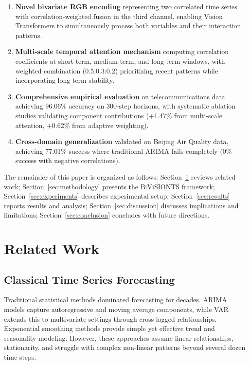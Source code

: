\documentclass[preprint,12pt,authoryear]{elsarticle}
\begin{document}
\begin{enumerate}
    \item \textbf{Novel bivariate RGB encoding} representing two correlated time series with correlation-weighted fusion in the third channel, enabling Vision Transformers to simultaneously process both variables and their interaction patterns.
    
    \item \textbf{Multi-scale temporal attention mechanism} computing correlation coefficients at short-term, medium-term, and long-term windows, with weighted combination (0.5:0.3:0.2) prioritizing recent patterns while incorporating long-term stability.
    
    \item \textbf{Comprehensive empirical evaluation} on telecommunications data achieving 96.06\% accuracy on 300-step horizons, with systematic ablation studies validating component contributions (+1.47\% from multi-scale attention, +0.62\% from adaptive weighting).
    
    \item \textbf{Cross-domain generalization} validated on Beijing Air Quality data, achieving 77.01\% success where traditional ARIMA fails completely (0\% success with negative correlations).
\end{enumerate}

The remainder of this paper is organized as follows: Section~\ref{sec:related} reviews related work; Section~\ref{sec:methodology} presents the BiViSIONTS framework; Section~\ref{sec:experiments} describes experimental setup; Section~\ref{sec:results} reports results and analysis; Section~\ref{sec:discussion} discusses implications and limitations; Section~\ref{sec:conclusion} concludes with future directions.

\section{Related Work}
\label{sec:related}

\subsection{Classical Time Series Forecasting}

Traditional statistical methods dominated forecasting for decades. ARIMA models \citep{box1970} capture autoregressive and moving average components, while VAR \citep{sims1980} extends this to multivariate settings through cross-lagged relationships. Exponential smoothing methods \citep{holt1957} provide simple yet effective trend and seasonality modeling. However, these approaches assume linear relationships, stationarity, and struggle with complex non-linear patterns beyond several dozen time steps.
\end{document}
